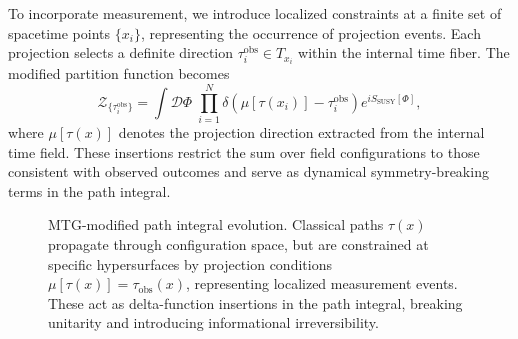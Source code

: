\documentclass[11pt]{article}
\begin{document}
To incorporate measurement, we introduce localized constraints at a finite set of spacetime points \( \{x_i\} \), representing the occurrence of projection events. Each projection selects a definite direction \( \tau^{\mathrm{obs}}_i \in T_{x_i} \) within the internal time fiber. The modified partition function becomes
\begin{equation}
\mathcal{Z}_{\{\tau^{\mathrm{obs}}_i\}} = \int \mathcal{D}\Phi \; \prod_{i=1}^N \delta\left( \mu[\tau(x_i)] - \tau^{\mathrm{obs}}_i \right) e^{i S_{\mathrm{SUSY}}[\Phi]},
\end{equation}
where \( \mu[\tau(x)] \) denotes the projection direction extracted from the internal time field. These insertions restrict the sum over field configurations to those consistent with observed outcomes and serve as dynamical symmetry-breaking terms in the path integral.
\begin{figure}[ht]
\centering
{}
\caption{MTG-modified path integral evolution. Classical paths \( \tau(x) \) propagate through configuration space, but are constrained at specific hypersurfaces by projection conditions \( \mu[\tau(x)] = \tau_{\text{obs}}(x) \), representing localized measurement events. These act as delta-function insertions in the path integral, breaking unitarity and introducing informational irreversibility.}
\label{fig:path_integral_projection}
\end{figure}
\end{document}
